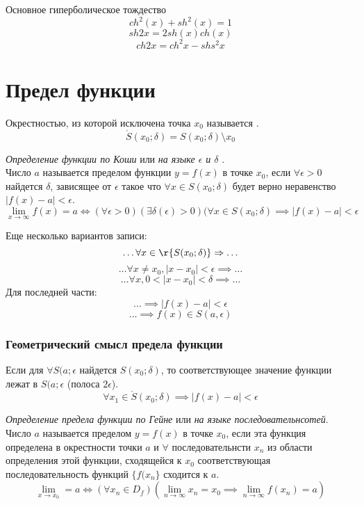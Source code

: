 Основное гиперболическое тождество
\[
  ch^2(x) + sh^2(x) = 1
\]
\[
  sh 2x = 2sh(x) ch(x)
\] 
\[
  ch 2x = ch^2x - shs^2x
\] 
\section{Предел функции}

\begin{definition}
  Окрестностью, из которой исключена точка $x_{0}$ называется .
  \[
    \mathring{S}(x_0; \delta) = S(x_0; \delta) \setminus {x_0}
  \] 
\end{definition}

\begin{definition}
  \textit{Определение функции по Коши} или \textit{на языке $\epsilon$ и $\delta$ }. \\
  Число $a$ называется пределом функции $y = f\left( x \right) $ в точке $x_0$, если $\forall \epsilon > 0$ найдется $\delta$, зависящее от  $\epsilon$ такое что $\forall x \in S(x_0; \delta)$ будет верно неравенство $|f\left( x \right) - a| < \epsilon$.
  \[
    \lim_{x \to \infty} f(x) = a \iff (\forall \epsilon > 0)(\exists  \delta(\epsilon) > 0)(\forall  x \in S(x_0; \delta) \implies |f(x) - a| < \epsilon
  \]

  Еще несколько вариантов записи:
  \[
    \ldots \forall x \in \r{S(x_0; \delta)} \implies \ldots
  \] 
  \[
  \ldots \forall x \neq x_0, |x - x_0| < \epsilon \implies \ldots
  \] 
  \[
  \ldots \forall x, 0 < |x - x_0| < \delta \implies \ldots
  \]
  Для последней части:
  \[
  \ldots \implies |f(x) - a| < \epsilon
  \] 
  \[
  \ldots \implies f(x) \in S(a, \epsilon)
  \] 
\end{definition}

\subsubsection*{Геометрический смысл предела функции}


Если для $\forall S(a; \epsilon$ найдется $S(x_0; \delta)$, то соответствующее значение функции лежат в  $S(a; \epsilon$ (полоса $2 \epsilon$).
\[
  \forall x_1 \in \mathring{S}(x_0; \delta) \implies |f(x) - a| < \epsilon
\] 
\begin{definition}
  \textit{Определение предела функции по Гейне} или \textit{на языке последовательнсотей}. \\
  Число $a$ называется пределом $y = f\left( x \right) $ в точке $x_0$, если эта функция определена в окрестности точки $a$ и $\forall$ последовательнсти $x_{n}$ из области определения этой функции, сходящейся к $x_0$ соответствующая последовательность функций $\{f(x_{n}\}$ сходится к $a$.
  \[
  \lim_{x \to x_0} = a \iff (\forall x_{n}\in D_f)(\lim_{n \to \infty} x_{n} = x_0 \implies \lim_{n \to \infty} f(x_{n}) = a) 
  \] 
\end{definition}


